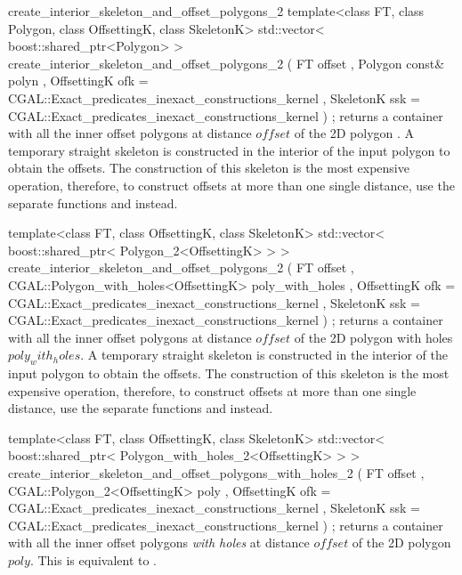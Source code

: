 \begin{ccRefFunction}{create_interior_skeleton_and_offset_polygons_2}
\ccFunction
{template<class FT, class Polygon, class OffsettingK, class SkeletonK>
std::vector< boost::shared_ptr<Polygon> >
create_interior_skeleton_and_offset_polygons_2 ( FT             offset
                                               , Polygon const& polyn
                                               , OffsettingK     ofk 
                                                  = CGAL::Exact_predicates_inexact_constructions_kernel
                                               , SkeletonK      ssk 
                                                  = CGAL::Exact_predicates_inexact_constructions_kernel
                                               ) ;
}
{returns a container with all the inner offset polygons at distance $offset$ of the 2D polygon .
A temporary straight skeleton is constructed in the interior of the input polygon to obtain the offsets. The construction of this skeleton is the most expensive operation, therefore, to construct offsets at more than one single distance, use the separate functions  and  instead.}





\ccFunction
{template<class FT, class OffsettingK, class SkeletonK>
std::vector< boost::shared_ptr< Polygon_2<OffsettingK> > >
create_interior_skeleton_and_offset_polygons_2 ( FT offset
                                               , CGAL::Polygon_with_holes<OffsettingK> poly_with_holes
                                               , OffsettingK ofk 
                                                  = CGAL::Exact_predicates_inexact_constructions_kernel
                                               , SkeletonK ssk 
                                                  = CGAL::Exact_predicates_inexact_constructions_kernel
                                    ) ;
}
{returns a container with all the inner offset polygons at distance $offset$ of the 2D polygon with holes $poly_with_holes$.
A temporary straight skeleton is constructed in the interior of the input polygon to obtain the offsets. The construction of this skeleton is the most expensive operation, therefore, to construct offsets at more than one single distance, use the separate functions  and  instead.}

\ccFunction
{template<class FT, class OffsettingK, class SkeletonK>
std::vector< boost::shared_ptr< Polygon_with_holes_2<OffsettingK> > >
create_interior_skeleton_and_offset_polygons_with_holes_2 
  ( FT offset
  , CGAL::Polygon_2<OffsettingK> poly
  , OffsettingK ofk = CGAL::Exact_predicates_inexact_constructions_kernel
  , SkeletonK ssk   = CGAL::Exact_predicates_inexact_constructions_kernel
  ) ;
}
{returns a container with all the inner offset polygons {\em with holes} at distance $offset$ of the 2D polygon $poly$.
This is equivalent to .}


\end{ccRefFunction}

